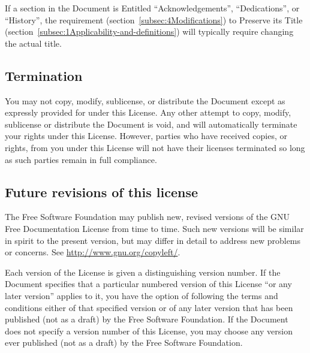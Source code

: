 {\tiny{}If a section in the Document is Entitled “Acknowledgements”,
“Dedications”, or “History”, the requirement (section~\ref{subsec:4Modifications})
to Preserve its Title (section~\ref{subsec:1Applicability-and-definitions})
will typically require changing the actual title.}{\tiny\par}

\subsection*{{\tiny{}Termination}}

{\tiny{}You may not copy, modify, sublicense, or distribute the Document
except as expressly provided for under this License. Any other attempt
to copy, modify, sublicense or distribute the Document is void, and
will automatically terminate your rights under this License. However,
parties who have received copies, or rights, from you under this License
will not have their licenses terminated so long as such parties remain
in full compliance.}{\tiny\par}

\subsection*{{\tiny{}Future revisions of this license}}

{\tiny{}The Free Software Foundation may publish new, revised versions
of the GNU Free Documentation License from time to time. Such new
versions will be similar in spirit to the present version, but may
differ in detail to address new problems or concerns. See \url{http://www.gnu.org/copyleft/}.}{\tiny\par}

{\tiny{}Each version of the License is given a distinguishing version
number. If the Document specifies that a particular numbered version
of this License “or any later version” applies to it, you have the
option of following the terms and conditions either of that specified
version or of any later version that has been published (not as a
draft) by the Free Software Foundation. If the Document does not specify
a version number of this License, you may choose any version ever
published (not as a draft) by the Free Software Foundation.}{\tiny\par}

\subsection*{}


